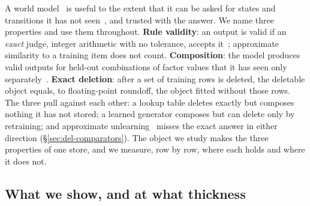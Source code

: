 \documentclass{article} %
\begin{document}
A world model~\citep{ha2018world,hafner2019dream,hafner2025mastering,schrittwieser2020mastering} is useful to the extent that it can be asked for states and transitions it
has not seen~\citep{micheli2023transformers,alonso2024diffusion,valevski2025diffusion,bruce2024genie}, and trusted with the answer. We name three properties and use them throughout.
\textbf{Rule validity}: an output is valid if an \emph{exact} judge, integer arithmetic with
no tolerance, accepts it~\citep{vafa2024evaluating}; approximate similarity to a training item does not count.
\textbf{Composition}: the model produces valid outputs for held-out combinations of factor
values that it has seen only separately~\citep{kipf2020contrastive,zhao2022toward}. \textbf{Exact deletion}: after a set of training rows
is deleted, the deletable object equals, to floating-point roundoff, the object fitted without
those rows. The three pull against each other: a lookup table deletes exactly but composes
nothing it has not stored; a learned generator composes but can delete only by retraining; and
approximate unlearning~\citep{guo2020certified,izzo2021approximate,golatkar2020eternal} misses the exact answer in either direction (\S\ref{sec:del-comparators}).
The object we study makes the three properties of one store, and we measure, row by row, where each
holds and where it does not.

\subsection{What we show, and at what thickness}
\label{sec:contrib}
\end{document}
